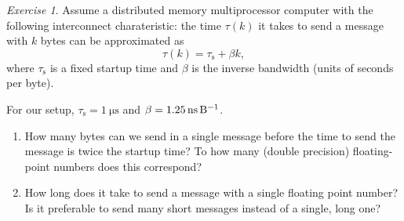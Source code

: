 \documentclass[onecolumn, oneside, a4paper, 11pt]{memoir}
\theoremstyle{remark}
\newtheorem{ex}{Exercise}
\newtheorem*{sol}{Solution}
\begin{document}

\begin{ex}
  Assume a distributed memory multiprocessor computer with the following
  interconnect charateristic: the time $\tau(k)$ it takes to send a message with
  $k$ bytes can be approximated as
  \[
    \tau(k) = \tau_\text{s} + \beta k,
  \]
  where $\tau_\text{s}$ is a fixed startup time and $\beta$ is the inverse
  bandwidth (units of seconds per byte).

  For our setup, $\tau_\text{s} = \SI{1}{\micro\second}$ and
  $\beta = \SI{1.25}{\nano\second\per\byte}$.
  \begin{enumerate}
  \item How many bytes can we send in a single message before the time to send
    the message is twice the startup time? To how many (double precision)
    floating-point numbers does this correspond?
  \item How long does it take to send a message with a single floating point
    number? Is it preferable to send many short messages instead of a single,
    long one?
  \end{enumerate}
\end{ex}
\end{document}
